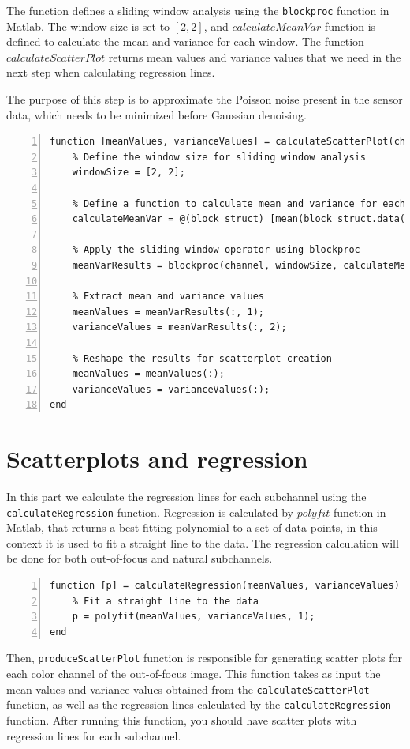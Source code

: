 \documentclass[12pt,a4paper,english
]{tunithesis}
\begin{document}
The function defines a sliding window analysis using the \texttt{blockproc} function in Matlab. The window size is set to $[2, 2]$, and $calculateMeanVar$ function is defined to calculate the mean and variance for each window. The function $calculateScatterPlot$ returns mean values and variance values that we need in the next step when calculating regression lines.

The purpose of this step is to approximate the Poisson noise present in the sensor data, which needs to be minimized before Gaussian denoising.

\begin{lstlisting}[style=Matlab-editor, numbers=left, basicstyle=\small]
% 4. Calculate scatter plots
function [meanValues, varianceValues] = calculateScatterPlot(channel)
    % Define the window size for sliding window analysis
    windowSize = [2, 2];

    % Define a function to calculate mean and variance for each window
    calculateMeanVar = @(block_struct) [mean(block_struct.data(:)), var(block_struct.data(:))];

    % Apply the sliding window operator using blockproc
    meanVarResults = blockproc(channel, windowSize, calculateMeanVar);

    % Extract mean and variance values
    meanValues = meanVarResults(:, 1);
    varianceValues = meanVarResults(:, 2);

    % Reshape the results for scatterplot creation
    meanValues = meanValues(:);
    varianceValues = varianceValues(:);
end
\end{lstlisting}

\section{Scatterplots and regression}
In this part we calculate the regression lines for each subchannel using the \texttt{calculateRegression} function. Regression is calculated by $polyfit$ function in Matlab, that returns a best-fitting polynomial to a set of data points, in this context it is used to fit a straight line to the data. The regression calculation will be done for both out-of-focus and natural subchannels.
\begin{lstlisting}[style=Matlab-editor, numbers=left, basicstyle=\small]
% 5. Calculate regression lines
function [p] = calculateRegression(meanValues, varianceValues)
    % Fit a straight line to the data
    p = polyfit(meanValues, varianceValues, 1);
end
\end{lstlisting}
Then,  \texttt{produceScatterPlot} function is responsible for generating scatter plots for each color channel of the out-of-focus image. This function takes as input the mean values and variance values obtained from the \texttt{calculateScatterPlot} function, as well as the regression lines calculated by the \texttt{calculateRegression} function. After running this function, you should have scatter plots with regression lines for each subchannel.
\end{document}
